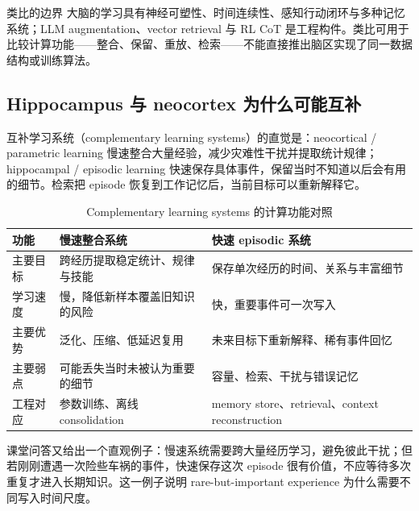 \begin{warningbox}{类比的边界}
大脑的学习具有神经可塑性、时间连续性、感知行动闭环与多种记忆系统；LLM augmentation、vector retrieval 与 RL CoT 是工程构件。类比可用于比较计算功能——整合、保留、重放、检索——不能直接推出脑区实现了同一数据结构或训练算法。
\end{warningbox}

\subsection{Hippocampus 与 neocortex 为什么可能互补}

互补学习系统（complementary learning systems）的直觉是：neocortical / parametric learning 慢速整合大量经验，减少灾难性干扰并提取统计规律；hippocampal / episodic learning 快速保存具体事件，保留当时不知道以后会有用的细节。检索把 episode 恢复到工作记忆后，当前目标可以重新解释它。


\begin{table}[H]
\centering
\small
\caption{Complementary learning systems 的计算功能对照}
\begin{tabularx}{\textwidth}{L{0.22\textwidth}X X}
\toprule
功能 & 慢速整合系统 & 快速 episodic 系统 \\
\midrule
主要目标 & 跨经历提取稳定统计、规律与技能 & 保存单次经历的时间、关系与丰富细节 \\
学习速度 & 慢，降低新样本覆盖旧知识的风险 & 快，重要事件可一次写入 \\
主要优势 & 泛化、压缩、低延迟复用 & 未来目标下重新解释、稀有事件回忆 \\
主要弱点 & 可能丢失当时未被认为重要的细节 & 容量、检索、干扰与错误记忆 \\
工程对应 & 参数训练、离线 consolidation & memory store、retrieval、context reconstruction \\
\bottomrule
\end{tabularx}
\end{table}


课堂问答又给出一个直观例子：慢速系统需要跨大量经历学习，避免彼此干扰；但若刚刚遭遇一次险些车祸的事件，快速保存这次 episode 很有价值，不应等待多次重复才进入长期知识。这一例子说明 rare-but-important experience 为什么需要不同写入时间尺度。


